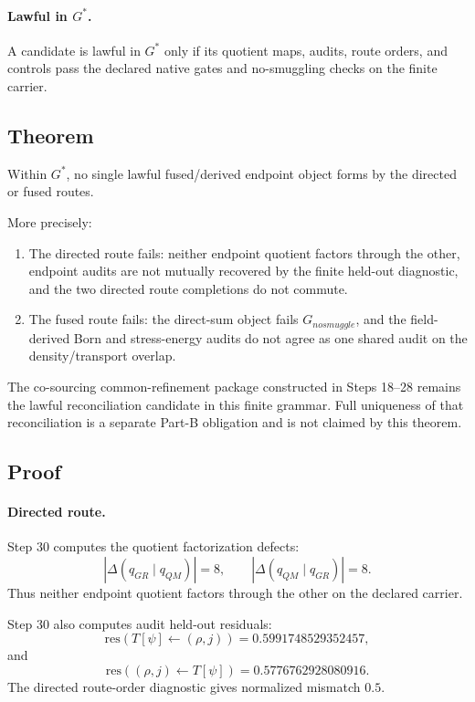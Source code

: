 \paragraph{Lawful in \(G^\ast\).}
A candidate is lawful in \(G^\ast\) only if its quotient maps, audits, route
orders, and controls pass the declared native gates and no-smuggling checks on
the finite carrier.

\subsection*{Theorem}

Within \(G^\ast\), no single lawful fused/derived endpoint object forms by the
directed or fused routes.

More precisely:
\begin{enumerate}
\item The directed route fails: neither endpoint quotient factors through the
  other, endpoint audits are not mutually recovered by the finite held-out
  diagnostic, and the two directed route completions do not commute.
\item The fused route fails: the direct-sum object fails \(G_{nosmuggle}\), and
  the field-derived Born and stress-energy audits do not agree as one shared
  audit on the density/transport overlap.
\end{enumerate}

The co-sourcing common-refinement package constructed in Steps 18--28 remains
the lawful reconciliation candidate in this finite grammar.  Full uniqueness
of that reconciliation is a separate Part-B obligation and is not claimed by
this theorem.

\subsection*{Proof}

\paragraph{Directed route.}
Step 30 computes the quotient factorization defects:
\[
|\Delta(q_{GR}\mid q_{QM})|=8,
\qquad
|\Delta(q_{QM}\mid q_{GR})|=8.
\]
Thus neither endpoint quotient factors through the other on the declared
carrier.

Step 30 also computes audit held-out residuals:
\[
\mathrm{res}(T[\psi]\leftarrow(\rho,j))=0.5991748529352457,
\]
and
\[
\mathrm{res}((\rho,j)\leftarrow T[\psi])=0.5776762928080916.
\]
The directed route-order diagnostic gives normalized mismatch \(0.5\).

